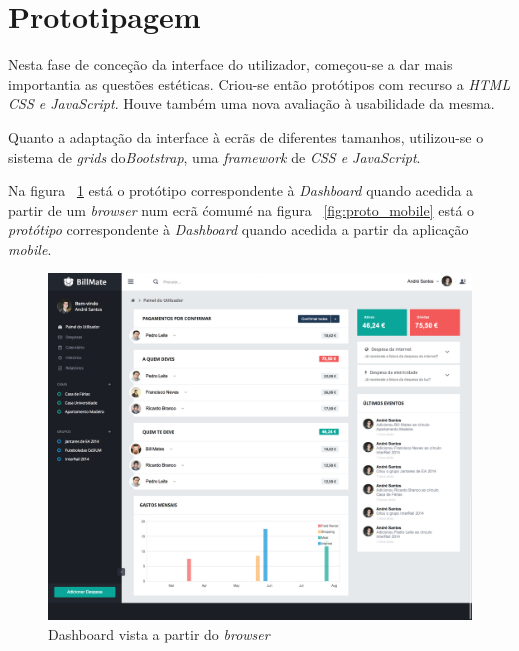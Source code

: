 \section{Prototipagem}

Nesta fase de conceção da interface do utilizador, começou-se a dar mais importantia as questões estéticas. Criou-se então protótipos com recurso a \emph{HTML CSS e JavaScript}. Houve também uma nova avaliação à usabilidade da mesma.

Quanto a adaptação da interface à ecrãs de diferentes tamanhos, utilizou-se o sistema de \emph{grids} do\emph{Bootstrap}, uma \emph{framework} de \emph{CSS e JavaScript}.

Na figura ~\ref{fig:proto_dash} está o protótipo correspondente à \emph{Dashboard} quando acedida a partir de um \emph{browser} num ecrã \'comum\' e na figura ~\ref{fig:proto_mobile} está o \emph{protótipo} correspondente à \emph{Dashboard} quando acedida a partir da aplicação \emph{mobile}.

\begin{figure}[ht]
\centering
\includegraphics[width=.9\textwidth]{images/dashboardprot}
\caption{Dashboard vista a partir do \emph{browser}}
\label{fig:proto_dash}
\end{figure}


